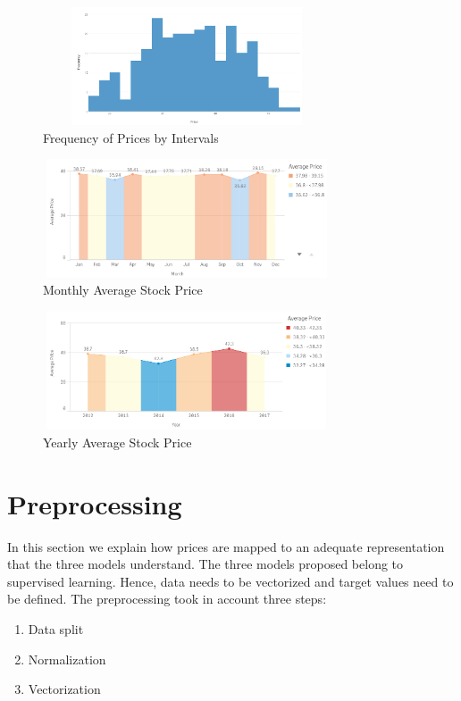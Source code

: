 \begin{figure}
\center
\includegraphics[width=8.5cm,height=3.5cm]{Figures/walmexHistogram.PNG}
\caption{Frequency of Prices by Intervals}
\label{fig:walmexFreq}
\end{figure}

\begin{figure}
\center
\includegraphics[width=8.5cm,height=3.5cm]{Figures/walmexMonth.PNG}
\caption{Monthly Average Stock Price}
\label{fig:walmexMonth}
\end{figure}

\begin{figure}
\center
\includegraphics[width=8.5cm,height=3.5cm]{Figures/walmexYear.PNG}
\caption{Yearly Average Stock Price}
\label{fig:walmexYear}
\end{figure}

\section{Preprocessing}
In this section we explain how prices are mapped to an adequate representation that the three models understand. The three models proposed belong to supervised learning. Hence, data needs to be vectorized and target values need to be defined. The preprocessing took in account three steps:

\begin{enumerate}
\item Data split
\item Normalization
\item Vectorization
\end{enumerate}

